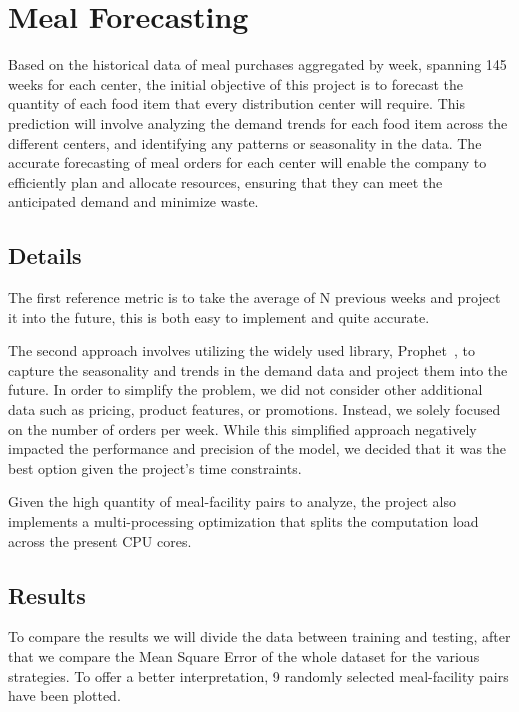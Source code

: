 \chapter{Meal Forecasting}
\label{meal-forecasting}

Based on the historical data of meal purchases aggregated by week, spanning 145 weeks for each center, the initial objective of this project is to forecast the quantity of each food item that every distribution center will require. This prediction will involve analyzing the demand trends for each food item across the different centers, and identifying any patterns or seasonality in the data. The accurate forecasting of meal orders for each center will enable the company to efficiently plan and allocate resources, ensuring that they can meet the anticipated demand and minimize waste.

\section{Details}
\label{meal-forecasting-details}
The first reference metric is to take the average of N previous weeks and project it into the future, this is both easy to implement and quite accurate.

The second approach involves utilizing the widely used library, Prophet~\cite{taylor2018forecasting}, to capture the seasonality and trends in the demand data and project them into the future. In order to simplify the problem, we did not consider other additional data such as pricing, product features, or promotions. Instead, we solely focused on the number of orders per week. While this simplified approach negatively impacted the performance and precision of the model, we decided that it was the best option given the project's time constraints.

Given the high quantity of meal-facility pairs to analyze, the project also implements a multi-processing optimization that splits the computation load across the present CPU cores.

\section{Results}
\label{meal-forecasting-results}
To compare the results we will divide the data between training and testing, after that we compare the Mean Square Error of the whole dataset for the various strategies. To offer a better interpretation, 9 randomly selected meal-facility pairs have been plotted.

